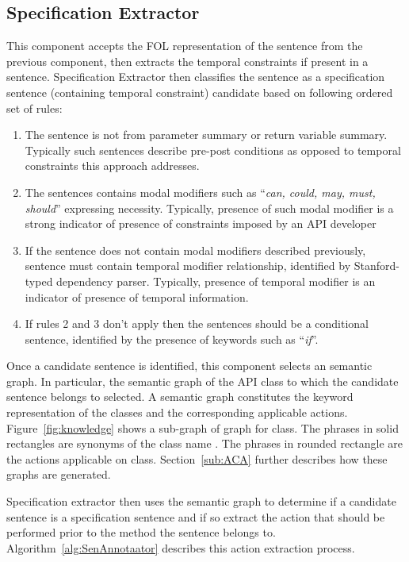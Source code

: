 \subsection{Specification Extractor}
\label{sub:SE}

This component accepts the FOL representation of the sentence from the previous component,
then extracts the temporal constraints if present in a sentence. 
Specification Extractor then classifies the sentence as a specification 
sentence (containing temporal constraint) candidate based on following ordered set of rules:

\begin{enumerate}
	\item The sentence is not from parameter summary or return variable summary.
	Typically such sentences describe pre-post conditions as opposed to temporal constraints this approach addresses.
	\item The sentences contains modal modifiers such as ``\textit{can, could, may, must, should}'' expressing necessity.
	Typically, presence of such modal modifier is a strong indicator of presence of constraints imposed by an API developer
	\item If the sentence does not contain modal modifiers described previously, sentence must contain temporal modifier relationship, identified by Stanford-typed dependency parser.
	Typically, presence of temporal modifier is an indicator of presence of temporal information.  
	\item If rules 2 and 3 don't apply then the sentences should be a conditional sentence, identified by the presence of keywords such as ``\textit{if}''.
\end{enumerate} 

Once a candidate sentence is identified, this component selects an semantic graph.
In particular, the semantic graph of the API class to which the candidate sentence belongs to selected.
A semantic graph constitutes the keyword representation of the classes and the corresponding applicable actions. 
Figure~\ref{fig:knowledge} shows a sub-graph of  graph for  class.
The phrases in solid rectangles are synonyms of the class name .
The phrases in rounded rectangle are the actions applicable on  class.
Section~\ref{sub:ACA} further describes how these graphs are generated.

 
Specification extractor then uses the semantic graph to determine
if a candidate sentence is a specification sentence and if so extract
the action that should be performed prior to the method the sentence
belongs to. Algorithm~\ref{alg:SenAnnotaator} describes this action extraction
process.  

